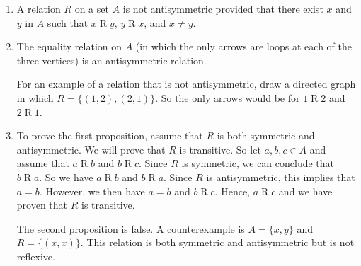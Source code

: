 \begin{enumerate}
\begin{enumerate}
\item A relation $R$ on a set $A$ is not antisymmetric provided that there exist $x$ and $y$ in $A$ such that 
$x \mathrel{R} y$, $y \mathrel{R} x$, and $x \ne y$.

\item The equality relation on $A$ (in which the only arrows are loops at each of the three vertices) is an antisymmetric relation.

\noindent
For an example of a relation that is not antisymmetric, draw a directed graph in which $R = \{ (1, 2), (2, 1) \}$.  So the only arrows would be for  $1 \mathrel{R} 2$ and  $2 \mathrel{R} 1$.



\item To prove the first proposition, assume that $R$ is both symmetric and antisymmetric.  We will prove that $R$ is transitive.  So let $a, b, c \in A$ and assume that $a \mathrel{R} b$ and 
$b \mathrel{R} c$. Since $R$ is symmetric, we can conclude that $b \mathrel{R} a$.  So we have 
$a \mathrel{R} b$ and $b \mathrel{R} a$.  Since $R$ is antisymmetric, this implies that 
$a = b$.  However, we then have $a = b$ and $b \mathrel{R} c$.  Hence, $a \mathrel{R} c$ and we have proven that $R$ is transitive.

\noindent
The second proposition is false.  A counterexample is $A = \{ x, y \}$ and $R = \{ (x, x) \}$.  This relation is both symmetric and antisymmetric but is not reflexive.
\end{enumerate}

\end{enumerate}

\hbreak
\endinput
















